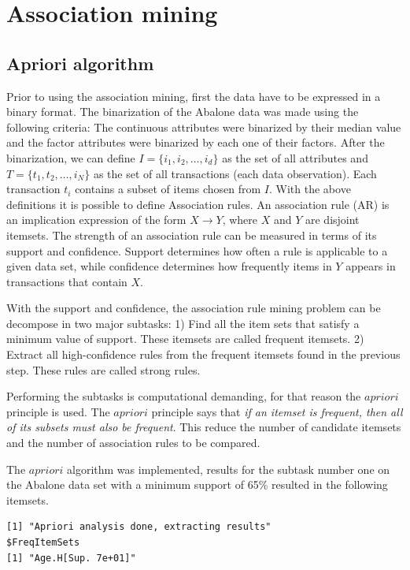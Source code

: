\documentclass[10pt, paper=a4]{article}
\begin{document}
\newpage
\section{Association mining}
\label{sec:association}
\subsection{Apriori algorithm}
Prior to using the association mining, first the data have to be expressed in a binary format. The binarization of the Abalone data was made using the following criteria: The continuous attributes were binarized by their median value and the factor attributes were binarized by each one of their factors. After the binarization, we can define $I=\{i_1, i_2,\ldots , i_d\}$ as the set of all attributes and $T=\{t_1, t_2, \ldots ,i_N\}$ as the set of all transactions (each data observation). Each transaction $t_i$ contains a subset of items chosen from $I$. With the above definitions it is possible to define Association rules. An association rule (AR) is an implication expression of the form $X \rightarrow Y$, where $X$ and $Y$ are disjoint itemsets. The strength of an association rule can be measured in terms of its support and confidence. Support determines how often a rule is applicable to a given data set, while confidence determines how frequently items in $Y$ appears in transactions that contain $X$.

With the support and confidence, the association rule mining problem can be decompose in two major subtasks: 1) Find all the item sets that satisfy a minimum value of support. These itemsets are called frequent itemsets. 2) Extract all high-confidence rules from the frequent itemsets found in the previous step. These rules are called strong rules.

Performing the subtasks is computational demanding, for that reason the $apriori$ principle is used. The $apriori$ principle says that \textit{if an itemset is frequent, then all of its subsets must also be frequent}. This reduce the number of candidate itemsets and the number of association rules to be compared.

The $apriori$ algorithm was implemented, results for the subtask number one on the Abalone data set with a minimum support of 65\% resulted in the following itemsets.
\begin{verbatim}
[1] "Apriori analysis done, extracting results"
$FreqItemSets
[1] "Age.H[Sup. 7e+01]"
\end{verbatim}
\end{document}
